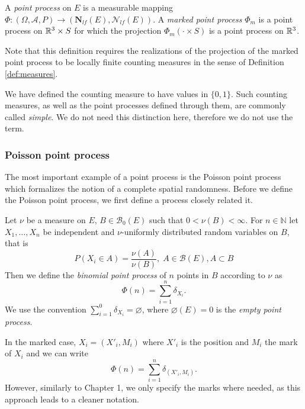 \begin{definition}
A \textit{point process} on $E$ is a measurable mapping $\Phi:(\Omega,\mathcal A, P) \to (\mathbf N_{lf}(E),\mathcal N_{lf}(E))$. \newline
A \textit{marked point process} $\Phi_m$ is a point process on ${\mathbb R^3}\times S$ for which the projection $\Phi_m(\cdot \times S)$ is a point process on ${\mathbb R^3}$.
\end{definition}
Note that this definition requires the realizations of the projection of the marked point process to be locally finite counting measures in the sense of Definition \ref{def:measures}.

\begin{remark}
	We have defined the counting measure to have values in $\{0,1\}$. Such counting measures, as well as the point processes defined through them, are commonly called \textit{simple}. We do not need this distinction here, therefore we do not use the term.
\end{remark}


\subsubsection{Poisson point process}
The most important example of a point process is the Poisson point process which formalizes the notion of a complete spatial randomness. Before we define the Poisson point process, we first define a process closely related it.

\begin{definition} Let $\nu$ be a measure on $E$, $B \in \mathcal B_0(E)$ such that $0<\nu(B)<\infty$. For $n\in \mathbb N$ let $X_1,\dots,X_n$ be independent and $\nu$-uniformly distributed random variables on $B$, that is
	$$P(X_i \in A) = \frac{\nu(A)}{\nu(B)},\; A\in\mathcal B(E), A \subset B$$
Then we define the \textit{binomial point process} of $n$ points in $B$ according to $\nu$ as
$$\Phi(n) = \sum^{n}_{i=1}  \delta_{X_i}.$$
We use the convention $\sum^0_{i=1} \delta_{X_i} = \varnothing$, where $\varnothing(E)=0$ is the \textit{empty point process}.
\end{definition}
In the marked case, $X_i=(X'_i,M_i)$ where $X'_i$ is the position and $M_i$ the mark of $X_i$ and we can write
$$\Phi(n) = \sum^{n}_{i=1} \delta_{(X'_i,M_i)}.$$
However, similarly to Chapter 1, we only specify the marks where needed, as this approach leads to a cleaner notation. 

